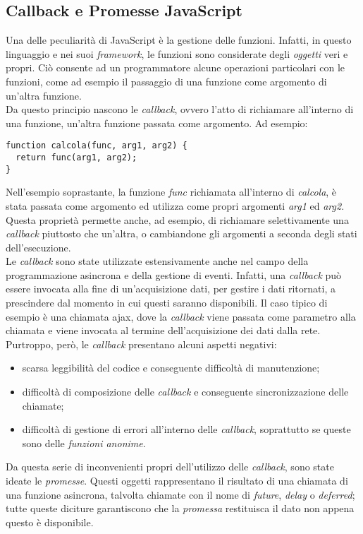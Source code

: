 \subsection{Callback e Promesse JavaScript}
Una delle peculiarità di JavaScript è la gestione delle funzioni. Infatti, in questo linguaggio e nei suoi \emph{framework}, le funzioni sono considerate degli \emph{oggetti} veri e propri. Ciò consente ad un programmatore alcune operazioni particolari con le funzioni, come ad esempio il passaggio di una funzione come argomento di un'altra funzione.\\
Da questo principio nascono le \emph{callback}, ovvero l'atto di richiamare all'interno di una funzione, un'altra funzione passata come argomento. Ad esempio:
\begin{verbatim}
function calcola(func, arg1, arg2) {
  return func(arg1, arg2);
}
\end{verbatim}
Nell'esempio soprastante, la funzione \emph{func} richiamata all'interno di \emph{calcola}, è stata passata come argomento ed utilizza come propri argomenti \emph{arg1} ed \emph{arg2}. Questa proprietà permette anche, ad esempio, di richiamare selettivamente una \emph{callback} piuttosto che un'altra, o cambiandone gli argomenti a seconda degli stati dell'esecuzione.\\
Le \emph{callback} sono state utilizzate estensivamente anche nel campo della programmazione asincrona e della gestione di eventi. Infatti, una \emph{callback} può essere invocata alla fine di un'acquisizione dati, per gestire i dati ritornati, a prescindere dal momento in cui questi saranno disponibili. Il caso tipico di esempio è una chiamata \gls{ajax}\glsfirstoccur, dove la \emph{callback} viene passata come parametro alla chiamata e viene invocata al termine dell'acquisizione dei dati dalla rete.\\
Purtroppo, però, le \emph{callback} presentano alcuni aspetti negativi:
\begin{itemize}
	\item scarsa leggibilità del codice e conseguente difficoltà di manutenzione;
	\item difficoltà di composizione delle \emph{callback} e conseguente sincronizzazione delle chiamate;
	\item difficoltà di gestione di errori all'interno delle \emph{callback}, soprattutto se queste sono delle \emph{funzioni anonime}.
\end{itemize}
Da questa serie di inconvenienti propri dell'utilizzo delle \emph{callback}, sono state ideate le \emph{promesse}. Questi oggetti rappresentano il risultato di una chiamata di una funzione asincrona, talvolta chiamate con il nome di \emph{future}, \emph{delay} o \emph{deferred}; tutte queste diciture garantiscono che la \emph{promessa} restituisca il dato non appena questo è disponibile.\\
